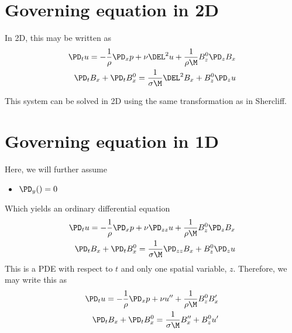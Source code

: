 \documentclass[11pt]{article}
\begin{document}
\section{Governing equation in 2D}
In 2D, this may be written as
\begin{equation}\begin{aligned}
\PD_t u                 = -\frac{1}{\rho}\PD_x p+ \nu \DEL^2 u + \frac{1}{\rho \M} B_z^0 \PD_z B_x \\
\PD_t B_x + \PD_t B_x^0 = \frac{1}{\sigma \M} \DEL^2 B_x + B_z^0 \PD_z u \\
\end{aligned} \end{equation}

This system can be solved in 2D using the same transformation as in Shercliff.

\section{Governing equation in 1D}
Here, we will further assume
\begin{itemize}\setlength\itemsep{-1em}
	\item $\PD_y () = 0$
\end{itemize}
Which yields an ordinary differential equation
\begin{equation}\begin{aligned}
\PD_t u                 = -\frac{1}{\rho}\PD_x p+ \nu \PD_{zz} u + \frac{1}{\rho \M} B_z^0 \PD_z B_x \\
\PD_t B_x + \PD_t B_x^0 = \frac{1}{\sigma \M} \PD_{zz} B_x + B_z^0 \PD_z u \\
\end{aligned} \end{equation}
This is a PDE with respect to $t$ and only one spatial variable, $z$. Therefore, we may write this as
\begin{equation}\begin{aligned}
\PD_t u                 = -\frac{1}{\rho}\PD_x p+ \nu u'' + \frac{1}{\rho \M} B_z^0 B_x' \\
\PD_t B_x + \PD_t B_x^0 = \frac{1}{\sigma \M} B_x'' + B_z^0 u' \\
\end{aligned} \end{equation}
\end{document}
